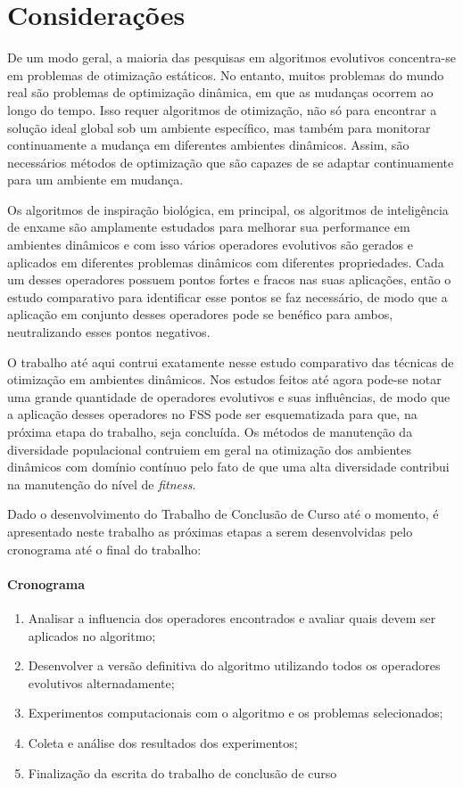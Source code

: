 \chapter{Considerações}
\label{ch:consideracoes}

De um modo geral, a maioria das pesquisas em algoritmos evolutivos concentra-se em problemas de otimização estáticos. No entanto, muitos problemas do mundo real são problemas de optimização dinâmica, em que as mudanças ocorrem ao longo do tempo. Isso requer algoritmos de otimização, não só para encontrar a solução ideal global sob um ambiente específico, mas também para monitorar continuamente a mudança em diferentes ambientes dinâmicos. Assim, são necessários métodos de optimização que são capazes de se adaptar continuamente para um ambiente em mudança.

Os algoritmos de inspiração biológica, em principal, os algoritmos de inteligência de enxame são amplamente estudados para melhorar sua performance em ambientes dinâmicos e com isso vários operadores evolutivos são gerados e aplicados em diferentes problemas dinâmicos com diferentes propriedades. Cada um desses operadores possuem pontos fortes e fracos nas suas aplicações, então o estudo comparativo para identificar esse pontos se faz necessário, de modo que a aplicação em conjunto desses operadores pode se benéfico para ambos, neutralizando esses pontos negativos.

O trabalho até aqui contrui exatamente nesse estudo comparativo das técnicas de otimização em ambientes dinâmicos. Nos estudos feitos até agora pode-se notar uma grande quantidade de operadores evolutivos e suas influências, de modo que a aplicação desses operadores no FSS pode ser esquematizada para que, na próxima etapa do trabalho, seja concluída. Os métodos de manutenção da diversidade populacional contruiem em geral na otimização dos ambientes dinâmicos com domínio contínuo pelo fato de que uma alta diversidade contribui na manutenção do nível de \textit{fitness}.

Dado o desenvolvimento do Trabalho de Conclusão de Curso até o momento, é apresentado neste trabalho as próximas etapas a serem desenvolvidas pelo cronograma até o final do trabalho:

\subsubsection{Cronograma}
\label{sec:cronograma}

\begin{enumerate}
\item Analisar a influencia dos operadores encontrados e avaliar quais devem ser aplicados no algoritmo;
\item Desenvolver a versão definitiva do algoritmo utilizando todos os operadores evolutivos alternadamente;
\item Experimentos computacionais com o algoritmo e os problemas selecionados;
\item Coleta e análise dos resultados dos experimentos; 
\item Finalização da escrita do trabalho de conclusão de curso
\end{enumerate}

